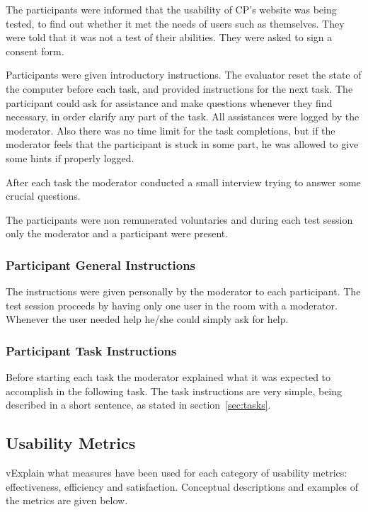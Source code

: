 \documentclass[a4paper]{article}
\begin{document}
The participants were informed that the usability of CP's website was being tested, to find out whether it met the needs of users such as themselves. They were told that it was not a test of their abilities. They were asked to sign a consent form.

Participants were given introductory instructions. The evaluator reset the state of the computer before each task, and provided instructions for the next task. 
The participant could ask for assistance and make questions whenever they find necessary, in order clarify any part of the task. All assistances were logged by the moderator. Also there was no time limit for the task completions, but if the moderator feels that the participant is stuck in some part, he was allowed to give some hints if properly logged.

After each task the moderator conducted a small interview trying to answer some crucial questions.

The participants were non remunerated voluntaries and during each test session only the moderator and a participant were present.

\subsubsection{Participant General Instructions}

The instructions were given personally by the moderator to each participant. The test session proceeds by having only one user in the room with a moderator. Whenever the user needed help he/she could simply ask for help.

\subsubsection{Participant Task Instructions}
Before starting each task the moderator explained what it was expected to accomplish in the following task. The task instructions are very simple, being described in a short sentence, as stated in section~\ref{sec:tasks}.

\subsection{Usability Metrics}
vExplain what measures have been used for each category of usability metrics: effectiveness, efficiency and satisfaction. Conceptual descriptions and examples of the metrics are given below.
\end{document}
